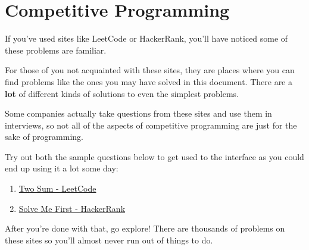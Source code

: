 \section{Competitive Programming}

If you've used sites like LeetCode or HackerRank, you'll have noticed some of these problems are familiar.

For those of you not acquainted with these sites, they are places where you can find problems like the ones you may have solved in this document. There are a \textbf{lot} of different kinds of solutions to even the simplest problems.

Some companies actually take questions from these sites and use them in interviews, so not all of the aspects of competitive programming are just for the sake of programming.

Try out both the sample questions below to get used to the interface as you could end up using it a lot some day:

\begin{enumerate}
\item \href{https://leetcode.com/problems/two-sum/}{Two Sum - LeetCode}
\item \href{https://www.hackerrank.com/challenges/solve-me-first/problem}{Solve Me First - HackerRank}
\end{enumerate}

After you're done with that, go explore! There are thousands of problems on these sites so you'll almost never run out of things to do.
